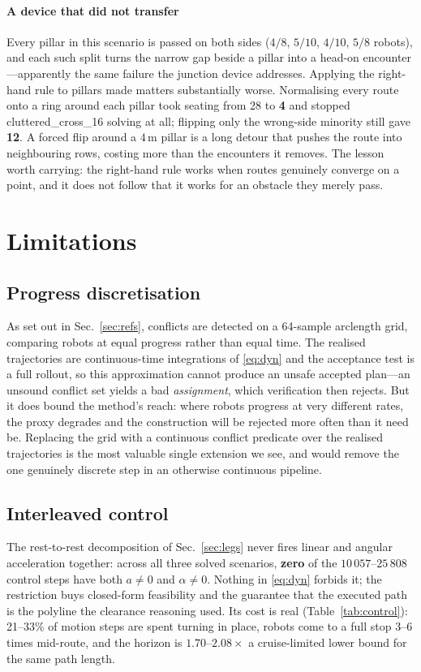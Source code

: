 \documentclass[conference]{IEEEtran}
\begin{document}
\paragraph{A device that did not transfer} Every pillar in this scenario is passed on both
sides ($4/8$, $5/10$, $4/10$, $5/8$ robots), and each such split turns the narrow gap beside
a pillar into a head-on encounter---apparently the same failure the junction device
addresses. Applying the right-hand rule to pillars made matters substantially worse.
Normalising every route onto a ring around each pillar took seating from 28 to \textbf{4}
and stopped cluttered\_cross\_16 solving at all; flipping only the wrong-side minority still
gave \textbf{12}. A forced flip around a $4$\,m pillar is a long detour that pushes the
route into neighbouring rows, costing more than the encounters it removes. The lesson worth
carrying: the right-hand rule works when routes genuinely converge on a point, and it does
not follow that it works for an obstacle they merely pass.

\section{Limitations}
\label{sec:lim}

\subsection{Progress discretisation}
As set out in Sec.~\ref{sec:refs}, conflicts are detected on a 64-sample arclength grid,
comparing robots at equal progress rather than equal time. The realised trajectories are
continuous-time integrations of \eqref{eq:dyn} and the acceptance test is a full rollout, so
this approximation cannot produce an unsafe accepted plan---an unsound conflict set yields a
bad \emph{assignment}, which verification then rejects. But it does bound the method's
reach: where robots progress at very different rates, the proxy degrades and the
construction will be rejected more often than it need be. Replacing the grid with a
continuous conflict predicate over the realised trajectories is the most valuable single
extension we see, and would remove the one genuinely discrete step in an otherwise
continuous pipeline.

\subsection{Interleaved control}
The rest-to-rest decomposition of Sec.~\ref{sec:legs} never fires linear and angular
acceleration together: across all three solved scenarios, \textbf{zero} of the
$10\,057$--$25\,808$ control steps have both $a \ne 0$ and $\alpha \ne 0$. Nothing in
\eqref{eq:dyn} forbids it; the restriction buys closed-form feasibility and the guarantee
that the executed path is the polyline the clearance reasoning used. Its cost is real
(Table~\ref{tab:control}): 21--33\% of motion steps are spent turning in place, robots come
to a full stop 3--6 times mid-route, and the horizon is $1.70$--$2.08\times$ a
cruise-limited lower bound for the same path length.
\end{document}

